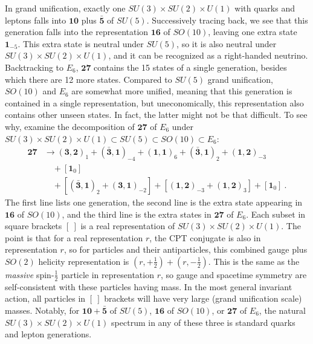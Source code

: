 In grand unification, exactly one $SU(3)\times SU(2)\times U(1)$ with quarks and leptons falls into $\mathbf{10}$ plus $\bar{\mathbf{5}}$ of $SU(5)$. Successively tracing back, we see that this generation falls into the representation $\mathbf{16}$ of $SO(10)$, leaving one extra state $\mathbf{1}_{-5}$. This extra state is neutral under $SU(5)$, so it is also neutral under $SU(3)\times SU(2)\times U(1)$, and it can be recognized as a right-handed neutrino. Backtracking to $E_{6}$, $\mathbf{27}$ contains the 15 states of a single generation, besides which there are 12 more states. Compared to $SU(5)$ grand unification, $SO(10)$ and $E_{6}$ are somewhat more unified, meaning that this generation is contained in a single representation, but uneconomically, this representation also contains other unseen states. In fact, the latter might not be that difficult. To see why, examine the decomposition of $\mathbf{27}$ of $E_{6}$ under $SU(3)\times SU(2)\times U(1)\subset SU(5)\subset SO(10)\subset E_{6}$:
\begin{align}
	\mathbf{27} &\to (\mathbf{3},\mathbf{2})_{1} + (\bar{\mathbf{3}},\mathbf{1})_{-4}
	+(\mathbf{1},\mathbf{1})_{6} + (\bar{\mathbf{3}},\mathbf{1})_{2}+(\mathbf{1},\mathbf{2})_{-3} \nonumber \\
	&\quad + [\mathbf{1}_{0}] \nonumber \\
	&\quad +[(\bar{\mathbf{3}},\mathbf{1})_{2}+(\mathbf{3},\mathbf{1})_{-2}]
	+[(\mathbf{1},\mathbf{2})_{-3}+(\mathbf{1},\mathbf{2})_{3}] + [\mathbf{1}_{0}] \:. \label{11.4.25}
\end{align}
The first line lists one generation, the second line is the extra state appearing in $\mathbf{16}$ of $SO(10)$, and the third line is the extra states in $\mathbf{27}$ of $E_{6}$. Each subset in square brackets $[\:]$ is a real representation of $SU(3)\times SU(2)\times U(1)$. The point is that for a real representation $r$, the \textsf{CPT} conjugate is also in representation $r$, so for particles and their antiparticles, this combined gauge plus $SO(2)$ helicity representation is $(r,+\frac{1}{2})+(r,-\frac{1}{2})$. This is the same as the \emph{massive} spin-$\frac{1}{2}$ particle in representation $r$, so gauge and spacetime symmetry are self-consistent with these particles having mass. In the most general invariant action, all particles in $[\:]$ brackets will have very large (grand unification scale) masses. Notably, for $\mathbf{10}+\bar{\mathbf{5}}$ of $SU(5)$, $\mathbf{16}$ of $SO(10)$, or $\mathbf{27}$ of $E_{6}$, the natural $SU(3)\times SU(2)\times U(1)$ spectrum in any of these three is standard quarks and lepton generations.
